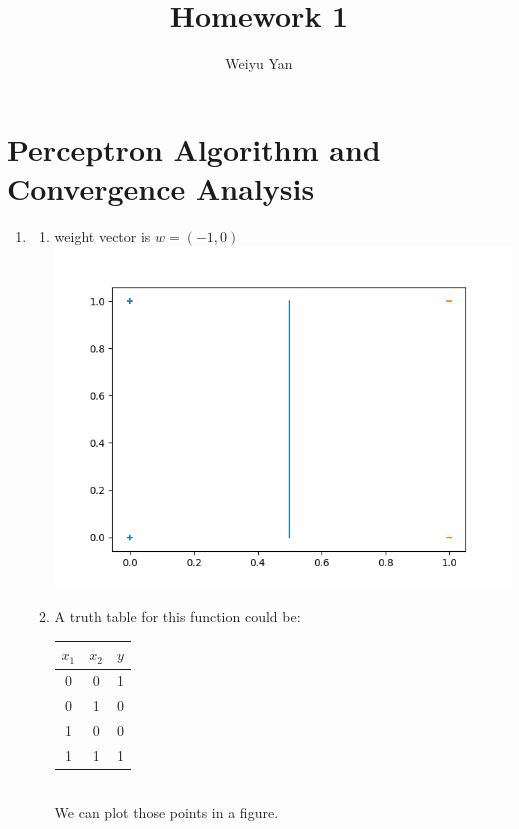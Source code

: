 \documentclass[11pt, oneside]{article}   	%
\title{Homework 1}
\author{Weiyu Yan}
\date{}							%
\begin{document}
\maketitle
\section{Perceptron Algorithm and Convergence Analysis}

\begin{enumerate}
\item	%
  \begin{enumerate}
  \item	%
    weight vector is $w=(-1,0)$ \\
    \includegraphics[width=15cm]{1_1a.png}\\
  \item	%
    A truth table for this function could be:\\
    \begin{tabular}{|c|c|c|}
      \hline
      $x_1$ & $x_2$ & $y$ \\ \hline
      0     & 0     & 1   \\ \hline
      0     & 1     & 0   \\ \hline
      1     & 0     & 0   \\ \hline
      1     & 1     & 1   \\ \hline
    \end{tabular}\\
    We can plot those points in a figure.\\

\end{enumerate}
\end{enumerate}
\end{document}
